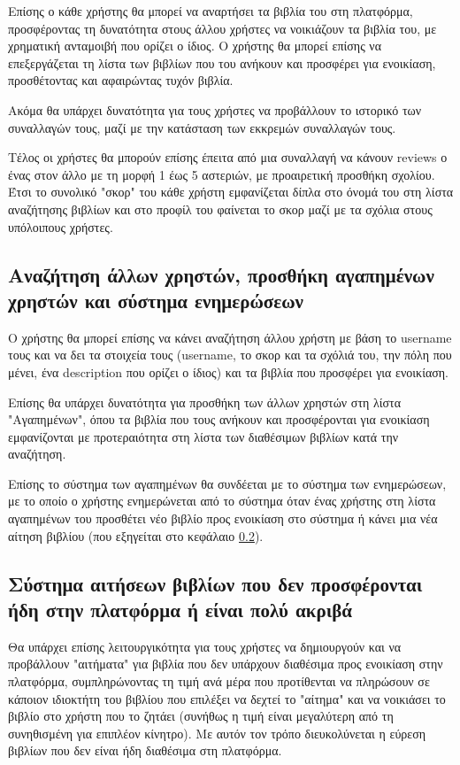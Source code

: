 \documentclass[12pt,a4paper]{article}
\begin{document}
Επίσης ο κάθε χρήστης θα μπορεί να αναρτήσει τα βιβλία του στη πλατφόρμα, προσφέροντας τη δυνατότητα στους άλλου χρήστες να νοικιάζουν τα βιβλία του, με χρηματική ανταμοιβή που ορίζει ο ίδιος. Ο χρήστης θα μπορεί επίσης να επεξεργάζεται τη λίστα των βιβλίων που του ανήκουν και προσφέρει για ενοικίαση, προσθέτοντας και αφαιρώντας τυχόν βιβλία.

Ακόμα θα υπάρχει δυνατότητα για τους χρήστες να προβάλλουν το ιστορικό των συναλλαγών τους, μαζί με την κατάσταση των εκκρεμών συναλλαγών τους.

Τέλος οι χρήστες θα μπορούν επίσης έπειτα από μια συναλλαγή να κάνουν reviews ο ένας στον άλλο με τη μορφή 1 έως 5 αστεριών, με προαιρετική προσθήκη σχολίου. Έτσι το συνολικό "σκορ" του κάθε χρήστη εμφανίζεται δίπλα στο όνομά του στη λίστα αναζήτησης βιβλίων και στο προφίλ του φαίνεται το σκορ μαζί με τα σχόλια στους υπόλοιπους χρήστες.

\subsection{Αναζήτηση άλλων χρηστών, προσθήκη αγαπημένων χρηστών και σύστημα ενημερώσεων}
Ο χρήστης θα μπορεί επίσης να κάνει αναζήτηση άλλου χρήστη με βάση το username τους και να δει τα στοιχεία τους (username, το σκορ και τα σχόλιά του, την πόλη που μένει, ένα description που ορίζει ο ίδιος) και τα βιβλία που προσφέρει για ενοικίαση.

Επίσης θα υπάρχει δυνατότητα για προσθήκη των άλλων χρηστών στη λίστα "Αγαπημένων", όπου τα βιβλία που τους ανήκουν και προσφέρονται για ενοικίαση εμφανίζονται με προτεραιότητα στη λίστα των διαθέσιμων βιβλίων κατά την αναζήτηση.

Επίσης το σύστημα των αγαπημένων θα συνδέεται με το σύστημα των ενημερώσεων, με το οποίο ο χρήστης ενημερώνεται από το σύστημα όταν ένας χρήστης στη λίστα αγαπημένων του προσθέτει νέο βιβλίο προς ενοικίαση στο σύστημα ή κάνει μια νέα αίτηση βιβλίου (που εξηγείται στο κεφάλαιο \ref{Αιτήσεις}).

\subsection{Σύστημα αιτήσεων βιβλίων που δεν προσφέρονται ήδη στην πλατφόρμα ή είναι πολύ ακριβά}
\label{Αιτήσεις}

Θα υπάρχει επίσης λειτουργικότητα για τους χρήστες να δημιουργούν και να προβάλλουν "αιτήματα" για βιβλία που δεν υπάρχουν διαθέσιμα προς ενοικίαση στην πλατφόρμα, συμπληρώνοντας τη τιμή ανά μέρα που προτίθενται να πληρώσουν σε κάποιον ιδιοκτήτη του βιβλίου που επιλέξει να δεχτεί το "αίτημα" και να νοικιάσει το βιβλίο στο χρήστη που το ζητάει (συνήθως η τιμή είναι μεγαλύτερη από τη συνηθισμένη για επιπλέον κίνητρο). Με αυτόν τον τρόπο διευκολύνεται η εύρεση βιβλίων που δεν είναι ήδη διαθέσιμα στη πλατφόρμα.
\end{document}
